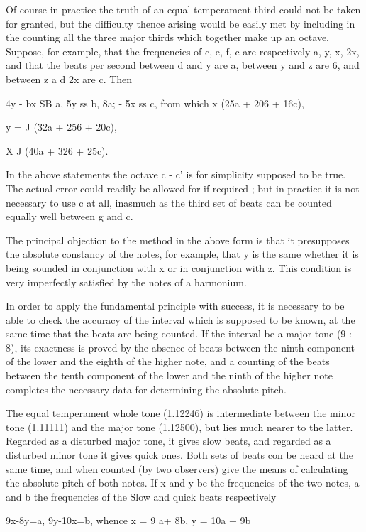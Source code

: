 Of course in practice the truth of an equal temperament third could not
be taken for granted, but the difficulty thence arising would be easily
met by including in the counting all the three major thirds which
together make up an octave. Suppose, for example, that the frequencies
of c, e, f, c are respectively a, y, x, 2x, and that the beats per
second between d and y are a, between y and z are 6, and between z a d
2x are c. Then

4y - bx SB a, 5y ss b, 8a; - 5x ss c, from which x (25a + 206 + 16c),

y = J (32a + 256 + 20c),

X J (40a + 326 + 25c).

In the above statements the octave c - c' is for simplicity supposed to
be true. The actual error could readily be allowed for if required ; but
in practice it is not necessary to use c at all, inasmuch as the third
set of beats can be counted equally well between g and c.

The principal objection to the method in the above form is that it
presupposes the absolute constancy of the notes, for example, that y is
the same whether it is being sounded in conjunction with x or in
conjunction with z. This condition is very imperfectly satisfied by the
notes of a harmonium.

In order to apply the fundamental principle with success, it is
necessary to be able to check the accuracy of the interval which is
supposed to be known, at the same time that the beats are being counted.
If the interval be a major tone (9 : 8), its exactness is proved by the
absence of beats between the ninth component of the lower and the eighth
of the higher note, and a counting of the beats between the tenth
component of the lower and the ninth of the higher note completes the
necessary data for determining the absolute pitch.

The equal temperament whole tone (1.12246) is intermediate between the
minor tone (1.11111) and the major tone (1.12500), but lies much nearer
to the latter. Regarded as a disturbed major tone, it gives slow beats,
and regarded as a disturbed minor tone it gives quick ones. Both sets of
beats con be heard at the same time, and when counted (by two observers)
give the means of calculating the absolute pitch of both notes. If x and
y be the frequencies of the two notes, a and b the frequencies of the
Slow and quick beats respectively

9x-8y=a,  9y-10x=b,
whence
x = 9 a+ 8b, y = 10a + 9b

